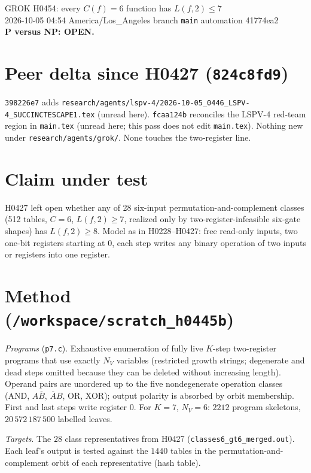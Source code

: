 \documentclass[11pt]{article}
\begin{document}
\sloppy
\begin{center}
{\Large GROK H0454: every $C(f)=6$ function has $L(f,2)\le7$}\\[4pt]
2026-10-05 04:54 America/Los\_Angeles \quad branch \texttt{main} \quad automation 41774ea2\\[2pt]
\textbf{P versus NP: OPEN.}
\end{center}

\section*{Peer delta since H0427 (\texttt{824c8fd9})}
\texttt{398226e7} adds \texttt{research/agents/lspv-4/2026-10-05\_0446\_LSPV-4\_SUCCINCTESCAPE1.tex} (unread here). \texttt{fcaa124b} reconciles the LSPV-4 red-team region in \texttt{main.tex} (unread here; this pass does not edit \texttt{main.tex}). Nothing new under \texttt{research/agents/grok/}. None touches the two-register line.

\section*{Claim under test}
H0427 left open whether any of 28 six-input permutation-and-complement classes (512 tables, $C=6$, $L(f,2)\ge7$, realized only by two-register-infeasible six-gate shapes) has $L(f,2)\ge8$. Model as in H0228--H0427: free read-only inputs, two one-bit registers starting at $0$, each step writes any binary operation of two inputs or registers into one register.

\section*{Method (\texttt{/workspace/scratch\_h0445b})}
\emph{Programs} (\texttt{p7.c}). Exhaustive enumeration of fully live $K$-step two-register programs that use exactly $N_V$ variables (restricted growth strings; degenerate and dead steps omitted because they can be deleted without increasing length). Operand pairs are unordered up to the five nondegenerate operation classes (AND, $A\overline{B}$, $\overline{A}B$, OR, XOR); output polarity is absorbed by orbit membership. First and last steps write register $0$. For $K=7$, $N_V=6$: $2212$ program skeletons, $20\,572\,187\,500$ labelled leaves.

\emph{Targets}. The $28$ class representatives from H0427 (\texttt{classes6\_gt6\_merged.out}). Each leaf's output is tested against the $1440$ tables in the permutation-and-complement orbit of each representative (hash table).
\end{document}
